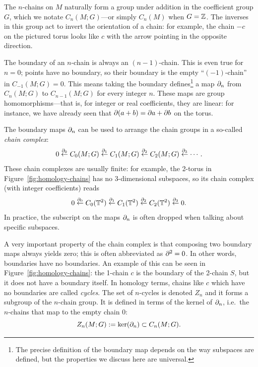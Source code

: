 The $n$-chains on $M$ naturally form a group under addition in the coefficient group $G$, which we notate $C_n(M;G)$---or simply $C_n(M)$ when $G=\mathbb{Z}$. The inverses in this group act to invert the orientation of a chain: for example, the chain $-c$ on the pictured torus looks like $c$ with the arrow pointing in the opposite direction.

The boundary of an $n$-chain is always an $(n-1)$-chain. This is even true for $n=0$; points have no boundary, so their boundary is the empty ``$(-1)$-chain'' in $C_{-1}(M;G) = 0$. This means taking the boundary defines\footnote{
	The precise definition of the boundary map depends on the way subspaces are defined, but the properties we discuss here are universal.}
a map $\partial_n$ from $C_n(M;G)$ to $C_{n-1}(M;G)$ for every integer $n$. These maps are group homomorphisms---that is, for integer or real coefficients, they are linear: for instance, we have already seen that $\partial(a+b) = \partial a + \partial b$ on the torus.

The boundary maps $\partial_n$ can be used to arrange the chain groups in a so-called \emph{chain complex}:
\begin{equation*}
	0 \overset{\partial_0}{\leftarrow} C_0(M;G) \overset{\partial_1}{\leftarrow} C_1(M;G) \overset{\partial_2}{\leftarrow} C_2(M;G) \overset{\partial_3}{\leftarrow} \cdots.
\end{equation*}
These chain complexes are usually finite: for example, the 2-torus in Figure~\ref{fig:homology-chains} has no 3-dimensional subspaces, so its chain complex (with integer coefficients) reads
\begin{equation*}
	0 \overset{\partial_0}{\leftarrow} C_0(\mathbb{T}^2) \overset{\partial_1}{\leftarrow} C_1(\mathbb{T}^2) \overset{\partial_2}{\leftarrow} C_2(\mathbb{T}^2) \overset{\partial_3}{\leftarrow} 0.
\end{equation*}
In practice, the subscript on the maps $\partial_n$ is often dropped when talking about specific subspaces.

A very important property of the chain complex is that composing two boundary maps always yields zero; this is often abbreviated as $\partial^2 = 0$. In other words, boundaries have no boundaries. An example of this can be seen in Figure~\ref{fig:homology-chains}: the 1-chain $c$ is the boundary of the 2-chain $S$, but it does not have a boundary itself. In homology terms, chains like $c$ which have no boundaries are called \emph{cycles}. The set of $n$-cycles is denoted $Z_n$ and it forms a subgroup of the $n$-chain group. It is defined in terms of the kernel of $\partial_n$, i.e.\ the $n$-chains that map to the empty chain 0:
\begin{equation*}
	Z_n(M;G) := \ker(\partial_n) \subset C_n(M;G).
\end{equation*}

